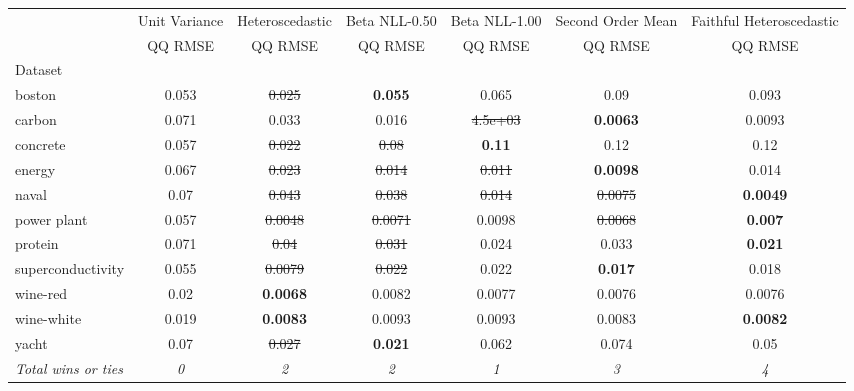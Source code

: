 \begin{tabular}{l|c|c|c|c|c|c}
\toprule
{} & {Unit Variance} & {Heteroscedastic} & {Beta NLL-0.50} & {Beta NLL-1.00} & {Second Order Mean} & {Faithful Heteroscedastic} \\
{} & {QQ RMSE} & {QQ RMSE} & {QQ RMSE} & {QQ RMSE} & {QQ RMSE} & {QQ RMSE} \\
{Dataset} & {} & {} & {} & {} & {} & {} \\
\midrule
boston & 0.053 & \sout{0.025} & \textbf{0.055} & 0.065 & 0.09 & 0.093 \\
carbon & 0.071 & 0.033 & 0.016 & \sout{4.5e+03} & \textbf{0.0063} & 0.0093 \\
concrete & 0.057 & \sout{0.022} & \sout{0.08} & \textbf{0.11} & 0.12 & 0.12 \\
energy & 0.067 & \sout{0.023} & \sout{0.014} & \sout{0.011} & \textbf{0.0098} & 0.014 \\
naval & 0.07 & \sout{0.043} & \sout{0.038} & \sout{0.014} & \sout{0.0075} & \textbf{0.0049} \\
power plant & 0.057 & \sout{0.0048} & \sout{0.0071} & 0.0098 & \sout{0.0068} & \textbf{0.007} \\
protein & 0.071 & \sout{0.04} & \sout{0.031} & 0.024 & 0.033 & \textbf{0.021} \\
superconductivity & 0.055 & \sout{0.0079} & \sout{0.022} & 0.022 & \textbf{0.017} & 0.018 \\
wine-red & 0.02 & \textbf{0.0068} & 0.0082 & 0.0077 & 0.0076 & 0.0076 \\
wine-white & 0.019 & \textbf{0.0083} & 0.0093 & 0.0093 & 0.0083 & \textbf{0.0082} \\
yacht & 0.07 & \sout{0.027} & \textbf{0.021} & 0.062 & 0.074 & 0.05 \\
\textit{{Total wins or ties}} & \textit{0} & \textit{2} & \textit{2} & \textit{1} & \textit{3} & \textit{4} \\
\bottomrule
\end{tabular}
